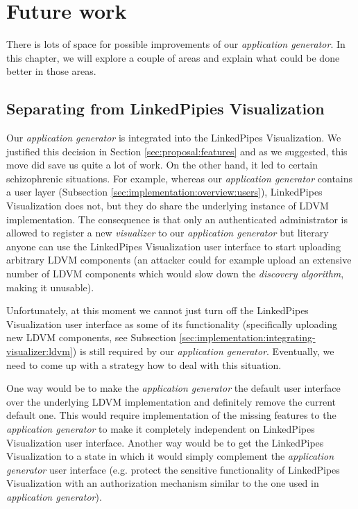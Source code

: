 \chapter{Future work}
\label{chap:future-work}

There is lots of space for possible improvements of our \emph{application generator}. In this chapter, we will explore a couple of areas and explain what could be done better in those areas.

\section{Separating from LinkedPipies Visualization}

Our \emph{application generator} is integrated into the LinkedPipes Visualization. We justified this decision in Section \ref{sec:proposal:features} and as we suggested, this move did save us quite a lot of work. On the other hand, it led to certain schizophrenic situations. For example, whereas our \emph{application generator} contains a user layer (Subsection \ref{sec:implementation:overview:users}), LinkedPipes Visualization does not, but they do share the underlying instance of LDVM implementation. The consequence is that only an authenticated administrator is allowed to register a new \emph{visualizer} to our \emph{application generator} but literary anyone can use the LinkedPipes Visualization user interface to start uploading arbitrary LDVM components (an attacker could for example upload an extensive number of LDVM components which would slow down the \emph{discovery algorithm}, making it unusable).

Unfortunately, at this moment we cannot just turn off the LinkedPipes Visualization user interface as some of its functionality (specifically uploading new LDVM components, see Subsection \ref{sec:implementation:integrating-visualizer:ldvm}) is still required by our \emph{application generator}. Eventually, we need to come up with a strategy how to deal with this situation. 

One way would be to make the \emph{application generator} the default user interface over the underlying LDVM implementation and definitely remove the current default one. This would require implementation of the missing features to the \emph{application generator} to make it completely independent on LinkedPipes Visualization user interface. Another way would be to get the LinkedPipes Visualization to a state in which it would simply complement the \emph{application generator} user interface (e.g. protect the sensitive functionality of LinkedPipes Visualization with an authorization mechanism similar to the one used in \emph{application generator}).

